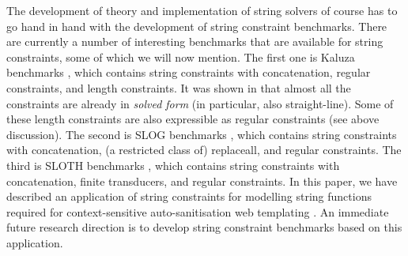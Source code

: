 The development of theory and implementation of string solvers of course
has to go hand in hand with the development of string constraint benchmarks.
There are currently a number of interesting benchmarks that are available for 
string constraints, some of which we will now mention. The first one is Kaluza 
benchmarks
\cite{Berkeley-JavaScript}, which contains
string constraints with concatenation, regular constraints, and length
constraints. It was shown in \cite{Vijay-length}
that almost all the constraints are already in
\emph{solved form} (in particular, also straight-line). Some of these length
constraints are also expressible as regular constraints (see above discussion).
The second is SLOG benchmarks \cite{fang-yu-circuits}, which contains
string constraints with concatenation, (a restricted class of) replaceall, and 
regular constraints. The third is SLOTH benchmarks \cite{HJLRV18}, which
contains string constraints with concatenation, finite transducers, and
regular constraints. In this paper, we have described an application of
string constraints for modelling string functions required for context-sensitive
auto-sanitisation web templating \cite{SSS11}. An immediate future research 
direction is to develop string constraint benchmarks based on this application.



